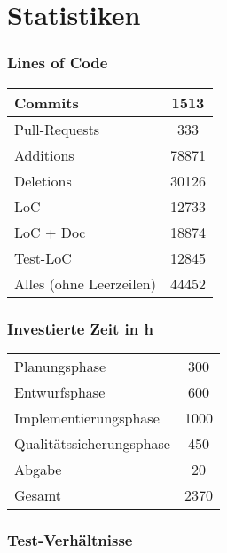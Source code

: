 \section{Statistiken}

\begin{frame}\frametitle{Lines of Code}
    \centering
    \begin{tabular}{l|c}
        Commits & 1513 \\
        \hline
        Pull-Requests & 333 \\
        \hline
        Additions & 78871\\
        \hline
        Deletions & 30126 \\
        \hline
        LoC & 12733 \\
        \hline
        LoC + Doc & 18874 \\
        \hline
        Test-LoC & 12845 \\
        \hline
        Alles (ohne Leerzeilen) & 44452
    \end{tabular}
\end{frame}

\begin{frame}\frametitle{Investierte Zeit in h}
    \centering
    \begin{tabular}{l|c}
        Planungsphase & 300 \\
        Entwurfsphase & 600 \\
        Implementierungsphase & 1000\\
        Qualitätssicherungsphase & 450 \\
        Abgabe & 20 \\
        \hline
        \hline
        Gesamt & 2370
    \end{tabular}
\end{frame}

\begin{frame}\frametitle{Test-Verhältnisse}
    \centering
    \begin{tabular}{l|c}
        
    \end{tabular}
\end{frame}